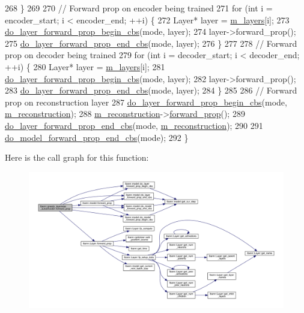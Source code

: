 \begin{DoxyCode}
268   \}
269 
270   \textcolor{comment}{// Forward prop on encoder being trained}
271   \textcolor{keywordflow}{for} (\textcolor{keywordtype}{int} i = encoder\_start; i < encoder\_end; ++i) \{
272     Layer* layer = \hyperlink{classlbann_1_1model_a0229fc226ec163d1411548446104569d}{m\_layers}[i];
273     \hyperlink{classlbann_1_1model_ac19ce0dd060f9caddd6e14974a6e7713}{do\_layer\_forward\_prop\_begin\_cbs}(mode, layer);
274     layer->forward\_prop();
275     \hyperlink{classlbann_1_1model_a7d6b891f58a7df9726e4f2c48d1f957a}{do\_layer\_forward\_prop\_end\_cbs}(mode, layer);
276   \}
277 
278   \textcolor{comment}{// Forward prop on decoder being trained}
279   \textcolor{keywordflow}{for} (\textcolor{keywordtype}{int} i = decoder\_start; i < decoder\_end; ++i) \{
280     Layer* layer = \hyperlink{classlbann_1_1model_a0229fc226ec163d1411548446104569d}{m\_layers}[i];
281     \hyperlink{classlbann_1_1model_ac19ce0dd060f9caddd6e14974a6e7713}{do\_layer\_forward\_prop\_begin\_cbs}(mode, layer);
282     layer->forward\_prop();
283     \hyperlink{classlbann_1_1model_a7d6b891f58a7df9726e4f2c48d1f957a}{do\_layer\_forward\_prop\_end\_cbs}(mode, layer);
284   \}
285 
286   \textcolor{comment}{// Forward prop on reconstruction layer}
287   \hyperlink{classlbann_1_1model_ac19ce0dd060f9caddd6e14974a6e7713}{do\_layer\_forward\_prop\_begin\_cbs}(mode, 
      \hyperlink{classlbann_1_1greedy__layerwise__autoencoder_a8238d2e3e723543c8b6f7f5c61a9ca06}{m\_reconstruction});
288   \hyperlink{classlbann_1_1greedy__layerwise__autoencoder_a8238d2e3e723543c8b6f7f5c61a9ca06}{m\_reconstruction}->\hyperlink{classlbann_1_1Layer_a2483ccd8a4406a6891f6176f1001b4e5}{forward\_prop}();
289   \hyperlink{classlbann_1_1model_a7d6b891f58a7df9726e4f2c48d1f957a}{do\_layer\_forward\_prop\_end\_cbs}(mode, 
      \hyperlink{classlbann_1_1greedy__layerwise__autoencoder_a8238d2e3e723543c8b6f7f5c61a9ca06}{m\_reconstruction});
290 
291   \hyperlink{classlbann_1_1model_a9d67f4f3a027327d2db8767759f9c2bf}{do\_model\_forward\_prop\_end\_cbs}(mode);
292 \}
\end{DoxyCode}
Here is the call graph for this function\+:\nopagebreak
\begin{figure}[H]
\begin{center}
\leavevmode
\includegraphics[width=350pt]{classlbann_1_1greedy__layerwise__autoencoder_af16aa7d2336a3f64e27970241cb2cd3e_cgraph}
\end{center}
\end{figure}
